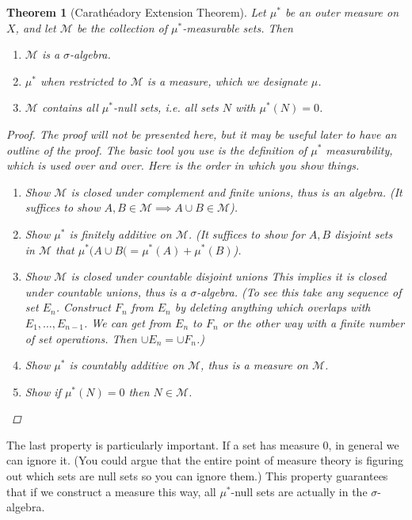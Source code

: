 \documentclass[12pt]{amsart}         %
\newtheorem{theorem}{Theorem}[section]
\theoremstyle{remark}
\begin{document}
\begin{theorem}[Carath\'{e}adory Extension Theorem]
Let $\mu^*$ be an outer measure on $X$, and let $\mathcal{M}$ be the collection of $\mu^*$-measurable sets. Then
\begin{enumerate}
    \item $\mathcal{M}$ is a $\sigma$-algebra.
    \item $\mu^*$ when restricted to $\mathcal{M}$ is a measure, which we designate $\mu$.
    \item $\mathcal{M}$ contains all $\mu^*$-null sets, i.e. all sets $N$ with $\mu^*(N) = 0$.
\end{enumerate}
\begin{proof}
The proof will not be presented here, but it may be useful later to have an outline of the proof. The basic tool you use is the definition of $\mu^*$ measurability, which is used over and over. Here is the order in which you show things.
\begin{enumerate}
    \item Show $\mathcal{M}$ is closed under complement and finite unions, thus is an algebra. (It suffices to show $A, B \in \mathcal{M} \implies A \cup B \in \mathcal{M}$).
    \item Show $\mu^*$ is finitely additive on $\mathcal{M}$. (It suffices to show for $A, B$ disjoint sets in $\mathcal{M}$ that $\mu^*(A \cup B( = \mu^*(A) + \mu^*(B)$).
    \item Show $\mathcal{M}$ is closed under countable disjoint unions This implies it is closed under countable unions, thus is a $\sigma$-algebra. (To see this take any sequence of set $E_n$. Construct $F_n$ from $E_n$ by deleting anything which overlaps with $E_1, \dots, E_{n-1}$. We can get from $E_n$ to $F_n$ or the other way with a finite number of set operations. Then $\cup E_n = \cup F_n$.)
    \item Show $\mu^*$ is countably additive on $\mathcal{M}$, thus is a measure on $\mathcal{M}$.
    \item Show if $\mu^*(N) = 0$ then $N \in \mathcal{M}$.
\end{enumerate}
\end{proof}
\end{theorem}

The last property is particularly important. If a set has measure 0, in general we can ignore it. (You could argue that the entire point of measure theory is figuring out which sets are null sets so you can ignore them.) This property guarantees that if we construct a measure this way, all $\mu^*$-null sets are actually in the $\sigma$-algebra.
\end{document}
